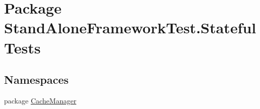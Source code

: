 \hypertarget{namespace_stand_alone_framework_test_1_1_stateful_tests}{\section{Package Stand\+Alone\+Framework\+Test.\+Stateful\+Tests}
\label{namespace_stand_alone_framework_test_1_1_stateful_tests}
}
\subsection*{Namespaces}
\begin{DoxyCompactItemize}
\item 
package \hyperlink{namespace_stand_alone_framework_test_1_1_stateful_tests_1_1_cache_manager}{Cache\+Manager}
\end{DoxyCompactItemize}
